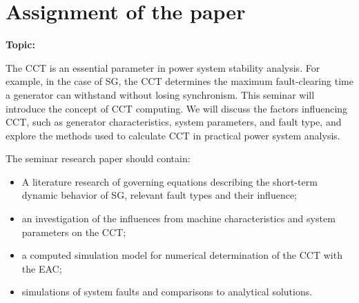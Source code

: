 
\chapter*{Assignment of the paper}
\thispagestyle{plain.scrheadings}
{\large \textbf{Topic:} \parbox[t]{0.8\textwidth}{\titel}}
\newline

The \ac{CCT} is an essential parameter in power system stability
analysis. For example, in the case of \ac{SG}, the \acs{CCT} determines the
maximum fault-clearing time a generator can withstand without losing synchronism.
This seminar will introduce the concept of \acs{CCT} computing. We will discuss the factors
influencing \acs{CCT}, such as generator characteristics, system parameters, and fault type,
and explore the methods used to calculate \acs{CCT} in practical power system analysis.


The seminar research paper should contain:
\begin{itemize}
    \item A literature research of governing equations describing the short-term dynamic behavior of \acs{SG}, relevant fault types and their influence;
    \item an investigation of the influences from machine characteristics and system parameters on the \acs{CCT};
    \item a computed simulation model for numerical determination of the \acs{CCT} with the \ac{EAC};
    \item simulations of system faults and comparisons to analytical solutions.
\end{itemize} 